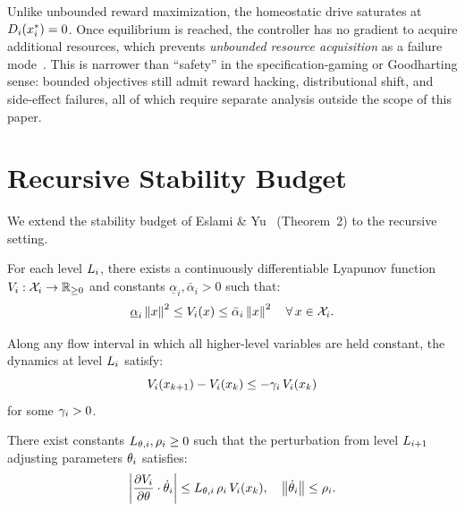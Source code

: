 \documentclass[11pt,a4paper]{article}
\begin{document}
\begin{remark}
Unlike unbounded reward maximization, the homeostatic drive saturates at
$D_{i}(x^*_{i}) = 0$.  Once equilibrium is reached, the
controller has no gradient to acquire additional resources, which
prevents \emph{unbounded resource acquisition} as a failure
mode~\cite{mineault2024neuroai}.  This is narrower than ``safety'' in
the specification-gaming or Goodharting sense: bounded objectives still
admit reward hacking, distributional shift, and side-effect failures,
all of which require separate analysis outside the scope of this paper.
\end{remark}


\section{Recursive Stability Budget}
\label{sec:stability}

We extend the stability budget of Eslami \& Yu~\cite{eslami2026control}
(Theorem~2) to the recursive setting.

\begin{assumption}
\label{ass:per-level}
For each level $L_{i}$, there exists a continuously differentiable Lyapunov
function $V_{i} : \mathcal{X}_i \to \mathbb{R}_{\geq 0}$ and constants
$\underline{\alpha}_i, \bar{\alpha}_i > 0$ such that:
\begin{equation}
  \underline{\alpha}_i \left\| x \right\|^2
  \leq V_{i}(x)
  \leq \bar{\alpha}_i \left\| x \right\|^2
  \quad \forall\, x \in \mathcal{X}_i.
\end{equation}
\end{assumption}

\begin{assumption}
\label{ass:decay}
Along any flow interval in which all higher-level variables are held constant,
the dynamics at level $L_{i}$ satisfy:
\begin{equation}
  V_{i}(x_{k+1}) - V_{i}(x_k) \leq -\gamma_i \, V_{i}(x_k)
\end{equation}
for some $\gamma_i > 0$.
\end{assumption}

\begin{assumption}
\label{ass:adapt}
There exist constants $L_{\theta,i}, \rho_i \geq 0$ such that the perturbation
from level $L_{i+1}$ adjusting parameters $\theta_i$ satisfies:
\begin{equation}
  \left| \frac{\partial V_{i}}{\partial \theta} \cdot \dot{\theta}_i \right|
  \leq L_{\theta,i} \, \rho_i \, V_{i}(x_k),
  \quad
  \left\| \dot{\theta}_i \right\| \leq \rho_i.
\end{equation}
\end{assumption}
\end{document}
